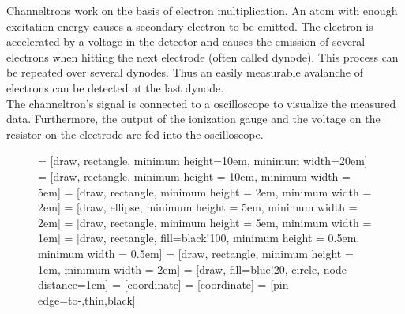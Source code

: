 \documentclass[a4paper,10pt]{article}
\begin{document}
Channeltrons work on the basis of electron multiplication. An atom with enough excitation energy causes a secondary electron to be emitted. The electron is accelerated by a voltage in the detector and causes the emission of several electrons when hitting the next electrode (often called dynode). This process can be repeated over several dynodes. Thus an easily measurable avalanche of electrons can be detected at the last dynode.
\\
The channeltron's signal is connected to a oscilloscope to visualize the measured data. Furthermore, the output of the ionization gauge and the voltage on the resistor on the electrode are fed into the oscilloscope.
\begin{figure}[H]
    \centering
     = [draw, rectangle,
    minimum height=10em, minimum width=20em]
     = [draw, rectangle, minimum height = 10em, minimum width = 5em]
     = [draw, rectangle, minimum height = 2em, minimum width = 2em]
     = [draw, ellipse, minimum height = 5em, minimum width = 2em]
     = [draw, rectangle, minimum height = 5em, minimum width = 1em]
     = [draw, rectangle, fill=black!100, minimum height = 0.5em, minimum width = 0.5em]
     = [draw, rectangle, minimum height = 1em, minimum width = 2em]
     = [draw, fill=blue!20, circle, node distance=1cm]
     = [coordinate]
     = [coordinate]
     = [pin edge={to-,thin,black}]

\end{figure}
\end{document}
